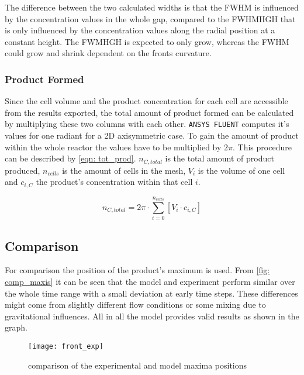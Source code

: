 \documentclass[../thesis.tex]{subfiles}
\begin{document}
The difference between the two calculated widths is that the FWHM is influenced by the concentration values in the whole gap, compared to the FWHMHGH that is only influenced by the concentration values along the radial position at a constant height. The FWMHGH is expected to only grow, whereas the FWHM could grow and shrink dependent on the fronts curvature.

\subsubsection{Product Formed}

Since the cell volume and the product concentration for each cell are accessible from the results exported, the total amount of product formed can be calculated by multiplying these two columns with each other. \texttt{ANSYS FLUENT} computes it's values for one radiant for a 2D axisymmetric case. To gain the amount of product within the whole reactor the values have to be multiplied by $2 \pi$. This procedure can be described by \autoref{eqn: tot_prod}. $ n_{C, total} $ is the total amount of product produced, $n_{cells}$ is the amount of cells in the mesh, $ V_i $ is the volume of one cell and $c_{i, C}$ the product's concentration within that cell $i$.

\begin{equation}
	n_{C, total} = 2 \pi \cdot \sum_{i=0}^{n_{cells}} \left[ V_i \cdot c_{i, C} \right]
	\label{eqn: tot_prod} 
\end{equation}

\subsection{Comparison}

For comparison the position of the product's maximum is used. From \autoref{fig: comp_maxis} it can be seen that the model and experiment perform similar over the whole time range with a small deviation at early time steps. These differences might come from slightly different flow conditions or some mixing due to gravitational influences. All in all the model provides valid results as shown in the graph.
\begin{figure}[htbp]
	\centering
	\texttt{[image: front\_exp]}
	\caption{comparison of the experimental and model maxima positions}
	\label{fig: comp_maxis}
\end{figure}
\end{document}

